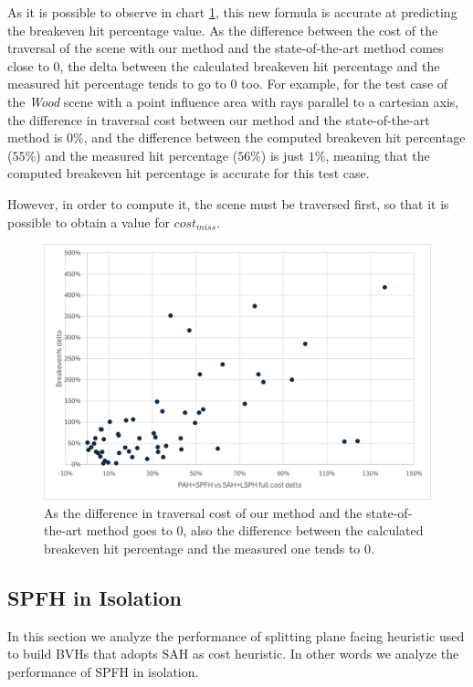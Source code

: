 \documentclass{PoliMi_MasterThesis}
\begin{document}
As it is possible to observe in chart \ref{fig:breakeven_hit_perc_accuracy}, this new formula is accurate at predicting the breakeven hit percentage value. As the difference between the cost of the traversal of the scene with our method and the state-of-the-art method comes close to 0, the delta between the calculated breakeven hit percentage and the measured hit percentage tends to go to 0 too. For example, for the test case of the \textit{Wood} scene with a point influence area with rays parallel to a cartesian axis, the difference in traversal cost between our method and the state-of-the-art method is $0\%$, and the difference between the computed breakeven hit percentage ($55\%$) and the measured hit percentage ($56\%$) is just $1\%$, meaning that the computed breakeven hit percentage is accurate for this test case.

However, in order to compute it, the scene must be traversed first, so that it is possible to obtain a value for $cost_{miss}$.

\begin{figure}[H] 
	\centering
	\includegraphics[width=\textwidth]{Images/breakeven_hit_perc_accuracy.png}
	\caption{As the difference in traversal cost of our method and the state-of-the-art method goes to 0, also the difference between the calculated breakeven hit percentage and the measured one tends to 0.}
	\label{fig:breakeven_hit_perc_accuracy}
\end{figure}

\subsection{SPFH in Isolation} \label{ssec:spfh_in_isolation}
In this section we analyze the performance of splitting plane facing heuristic used to build BVHs that adopts SAH as cost heuristic. In other words we analyze the performance of SPFH in isolation.
\end{document}
